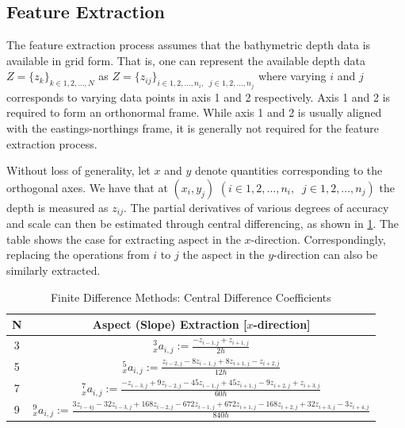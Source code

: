 			\FloatBarrier
	
		\subsection{Feature Extraction}
		\label{BenthicHabitatMapping:BathymetricFeatures:FeatureExtraction}
		
			The feature extraction process assumes that the bathymetric depth data is available in grid form. That is, one can represent the available depth data $Z = \{z_{k}\}_{k \in {1, 2, ..., N}}$ as $Z = \{z_{ij}\}_{i \in {1, 2, ..., n_{i}}, \;\; j \in {1, 2, ..., n_{j}}}$ where varying $i$ and $j$ corresponds to varying data points in axis 1 and 2 respectively. Axis 1 and 2 is required to form an orthonormal frame. While axis 1 and 2 is usually aligned with the eastings-northings frame, it is generally not required for the feature extraction process.
			
			Without loss of generality, let $x$ and $y$ denote quantities corresponding to the orthogonal axes. We have that at $(x_{i}, y_{j})$ $(i \in {1, 2, ..., n_{i}}, \;\; j \in {1, 2, ..., n_{j}})$ the depth is measured as $z_{ij}$. The partial derivatives of various degrees of accuracy and scale can then be estimated through central differencing, as shown in \cref{Table:AspectExtraction}. The table shows the case for extracting aspect in the $x$-direction. Correspondingly, replacing the operations from $i$ to $j$ the aspect in the $y$-direction can also be similarly extracted.
			
			\bgroup
			\def\arraystretch{2}%
			\begin{table}[h]
				\begin{center}
					\begin{tabular}{ |c|c| }
						\hline
						N & Aspect (Slope) Extraction [$x$-direction]\\
						\hline
						3 & $^{3}_{x}a_{i, j} := \frac{- z_{i - 1, j} + z_{i + 1, j}}{2h}$ \\
						5 & $^{5}_{x}a_{i, j} := \frac{z_{i - 2, j} - 8 z_{i - 1, j} + 8 z_{i + 1, j} - z_{i + 2, j}}{12h}$ \\
						7 & $^{7}_{x}a_{i, j} := \frac{-z_{i - 3, j} + 9 z_{i - 2, j} - 45 z_{i - 1, j} + 45 z_{i + 1, j} - 9 z_{i + 2, j} + z_{i + 3, j}}{60h}$ \\
						9 & $^{9}_{x}a_{i, j} := \frac{3 z_{i - 4 j} - 32 z_{i - 3, j} + 168 z_{i - 2, j} - 672 z_{i - 1, j} + 672 z_{i + 1, j} - 168 z_{i + 2, j} + 32 z_{i + 3, j} - 3 z_{i + 4, j}}{840h}$ \\
						\hline
					\end{tabular}
				\end{center}
		  	\caption{Finite Difference Methods: Central Difference Coefficients}
		  	\label{Table:AspectExtraction}			
		  	\end{table}	
	  		\egroup
	  		
